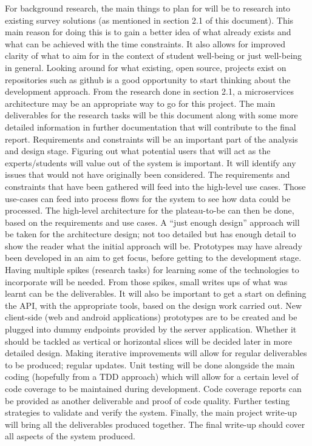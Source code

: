 For background research, the main things to plan for will be to research into existing survey solutions (as mentioned in section 2.1 of this document). This main reason for doing this is to gain a better idea of what already exists and what can be achieved with the time constraints. It also allows for improved clarity of what to aim for in the context of student well-being or just well-being in general. Looking around for what existing, open source, projects exist on repositories such as github is a good opportunity to start thinking about the development approach. From the research done in section 2.1, a microservices architecture may be an appropriate way to go for this project. The main deliverables for the research tasks will be this document along with some more detailed information in further documentation that will contribute to the final report.
Requirements and constraints will be an important part of the analysis and design stage. Figuring out what potential users that will act as the experts/students will value out of the system is important. It will identify any issues that would not have originally been considered. The requirements and constraints that have been gathered will feed into the high-level use cases. Those use-cases can feed into process flows for the system to see how data could be processed. The high-level architecture for the plateau-to-be can then be done, based on the requirements and use cases. A “just enough design” approach will be taken for the architecture design; not too detailed but has enough detail to show the reader what the initial approach will be. 
Prototypes may have already been developed in an aim to get focus, before getting to the development stage. Having multiple spikes (research tasks) for learning some of the technologies to incorporate will be needed. From those spikes, small writes ups of what was learnt can be the deliverables. It will also be important to get a start on defining the API, with the appropriate tools, based on the design work carried out. New client-side (web and android applications) prototypes are to be created and be plugged into dummy endpoints provided by the server application. Whether it should be tackled as vertical or horizontal slices will be decided later in more detailed design. Making iterative improvements will allow for regular deliverables to be produced; regular updates. 
Unit testing will be done alongside the main coding (hopefully from a TDD approach) which will allow for a certain level of code coverage to be maintained during development. Code coverage reports can be provided as another deliverable and proof of code quality. Further testing strategies to validate and verify the system.
Finally, the main project write-up will bring all the deliverables produced together. The final write-up should cover all aspects of the system produced.


